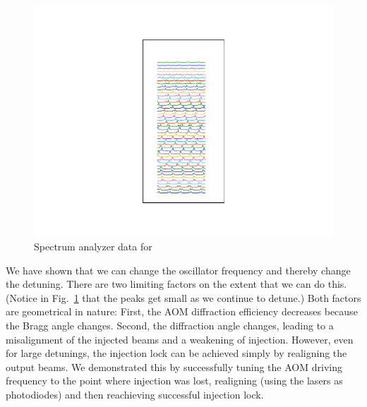 \begin{figure}
\centerline{\includegraphics{all_splittingData}}
\caption[]{\label{fig:alldata} 
Spectrum analyzer data for }
\end{figure}


We have shown that we can change the oscillator frequency and thereby change the detuning. There are two limiting factors on the extent that we can do this. (Notice in Fig.\ \ref{fig:alldata} that the peaks get small as we continue to detune.) Both factors are geometrical in nature: First, the AOM diffraction efficiency decreases because the Bragg angle changes. Second, the diffraction angle changes, leading to a misalignment of the injected beams and a weakening of injection. However, even for large detunings, the injection lock can be achieved simply by realigning the output beams. We demonstrated this by successfully tuning the AOM driving frequency to the point where injection was lost, realigning (using the lasers as photodiodes) and then reachieving successful injection lock.


